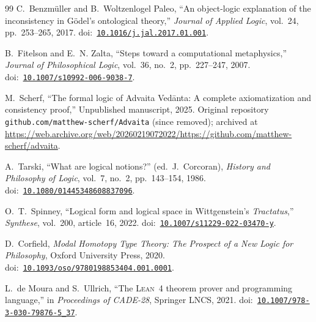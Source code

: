 \documentclass[10pt, letterpaper]{article}
\theoremstyle{definition}
\theoremstyle{remark}
\begin{document}
\begin{thebibliography}{99}
C.~Benzm\"uller and B.~Woltzenlogel Paleo,
``An object-logic explanation of the inconsistency in G\"odel's
ontological theory,''
\emph{Journal of Applied Logic}, vol.~24, pp.~253--265, 2017.
\newline doi:~\href{https://doi.org/10.1016/j.jal.2017.01.001}{\texttt{10.1016/j.jal.2017.01.001}}.

B.~Fitelson and E.~N. Zalta,
``Steps toward a computational metaphysics,''
\emph{Journal of Philosophical Logic}, vol.~36, no.~2,
pp.~227--247, 2007.
\newline doi:~\href{https://doi.org/10.1007/s10992-006-9038-7}{\texttt{10.1007/s10992-006-9038-7}}.

M.~Scherf,
``The formal logic of Advaita Ved\=anta: A complete
axiomatization and consistency proof,''
Unpublished manuscript, 2025.
Original repository \texttt{github.com/matthew-scherf/Advaita}
(since removed); archived at
\url{https://web.archive.org/web/20260219072022/https://github.com/matthew-scherf/advaita}.

A.~Tarski,
``What are logical notions?''
(ed.\ J.~Corcoran),
\emph{History and Philosophy of Logic}, vol.~7, no.~2,
pp.~143--154, 1986.
\newline doi:~\href{https://doi.org/10.1080/01445348608837096}{\texttt{10.1080/01445348608837096}}.

O.~T.~Spinney,
``Logical form and logical space in Wittgenstein's
\emph{Tractatus},''
\emph{Synthese}, vol.~200, article~16, 2022.
\newline doi:~\href{https://doi.org/10.1007/s11229-022-03470-y}{\texttt{10.1007/s11229-022-03470-y}}.

D.~Corfield,
\emph{Modal Homotopy Type Theory: The Prospect of a New Logic
for Philosophy},
Oxford University Press, 2020.
\newline doi:~\href{https://doi.org/10.1093/oso/9780198853404.001.0001}{\texttt{10.1093/oso/9780198853404.001.0001}}.

L.~de Moura and S.~Ullrich,
``The \textsc{Lean}~4 theorem prover and programming language,''
in \emph{Proceedings of CADE-28}, Springer LNCS, 2021.
\newline doi:~\href{https://doi.org/10.1007/978-3-030-79876-5_37}{\texttt{10.1007/978-3-030-79876-5\_37}}.

\end{thebibliography}
\end{document}
